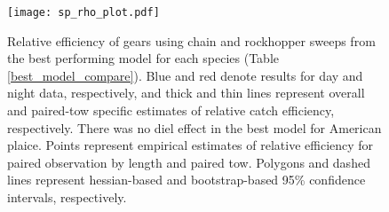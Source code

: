 \documentclass[
  12pt,
]{article}
\begin{document}
\clearpage

\begin{figure}
\caption{Relative efficiency  of gears using chain and rockhopper sweeps from the best performing model for each species (Table \ref{best_model_compare}). Blue and red denote results for day and night data, respectively, and thick and thin lines represent overall and paired-tow specific estimates of relative catch efficiency, respectively. There was no diel effect in the best model for American plaice. Points represent empirical estimates of relative efficiency for paired observation by length and paired tow. Polygons and dashed lines represent hessian-based and bootstrap-based 95\% confidence intervals, respectively.}\label{sp_rho_plot}
\begin{center}
\texttt{[image: sp\_rho\_plot.pdf]}
\end{center}
\end{figure}

\clearpage
\end{document}
